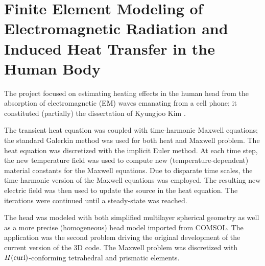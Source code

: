 \section{Finite Element Modeling of Electromagnetic Radiation and Induced Heat Transfer in the Human Body}
\label{sec:human-body}

The project focused on estimating heating effects in the human head from the absorption of electromagnetic (EM) waves emanating from a  cell phone; it constituted (partially) the dissertation of Kyungjoo Kim \cite{Kim2013phd}.

The transient heat equation was coupled with time-harmonic Maxwell equations; the standard Galerkin method was used for both heat and Maxwell problem. The heat equation was discretized with the implicit Euler method. At each time step, the new temperature field was used to compute new (temperature-dependent) material constants for the Maxwell equations. Due to disparate time scales, the time-harmonic version of the Maxwell equations was employed. The resulting new electric field was then used to update the source in the heat equation. The iterations were continued until a steady-state was reached.

The head was modeled with both simplified multilayer spherical geometry as well as a more precise (homogeneous) head model imported from COMSOL. The application was the second problem driving the original development of the current version of the \hp3D code. The Maxwell problem was discretized with $H(\text{curl})$-conforming tetrahedral and prismatic elements.

\clearpage

%


